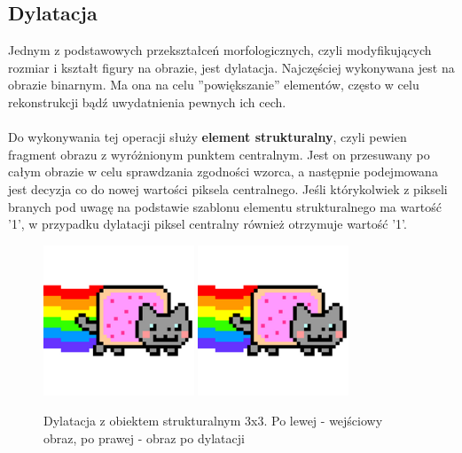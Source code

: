 \subsection{Dylatacja}
Jednym z podstawowych przekształceń morfologicznych, czyli modyfikujących rozmiar i kształt figury na obrazie, jest dylatacja. Najczęściej wykonywana jest na obrazie binarnym. Ma ona na celu ''powiększanie'' elementów, często w celu rekonstrukcji bądź uwydatnienia pewnych ich cech.
\paragraph{}
Do wykonywania tej operacji służy \textbf{element strukturalny}, czyli pewien fragment obrazu z wyróżnionym punktem centralnym. Jest on przesuwany po całym obrazie w celu sprawdzania zgodności wzorca, a następnie podejmowana jest decyzja co do nowej wartości piksela centralnego. Jeśli którykolwiek z pikseli branych pod uwagę na podstawie szablonu elementu strukturalnego ma wartość '1', w przypadku dylatacji piksel centralny również otrzymuje wartość '1'.
\begin{figure}[!htb]
\centering

\includegraphics[width=0.4\textwidth]{img/sample}
\includegraphics[width=0.4\textwidth]{img/sample}
\caption{Dylatacja z obiektem strukturalnym 3x3. Po lewej - wejściowy obraz, po prawej - obraz po dylatacji}
\end{figure}
